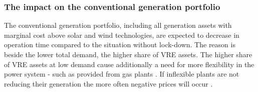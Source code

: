 \documentclass[energies,article,submit,moreauthors,pdftex]{Definitions/mdpi}
\begin{document}
\subsubsection{The impact on the conventional generation portfolio}

The conventional generation portfolio, including all generation assets with marginal cost above solar and wind technologies, are expected to decrease in operation time compared to the situation without lock-down. The reason is beside the lower total demand, the higher share of VRE assets. The higher share of VRE assets at low demand cause additionally a need for more flexibility in the power system - such as provided from gas plants \cite{Hirth2014TheVariability}. If inflexible plants are not reducing their generation the more often negative prices will occur \cite{IEA2016Re-poweringSystems.,Cochran2013MarketSystems}.



\end{document}
